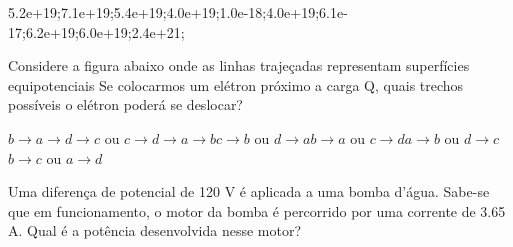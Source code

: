 \documentclass[12pt, addpoints]{exam}
\begin{document}
\begin{questions}
\begin{multicols*}{2}
\begin{oneparchoices}
\choice 5.2e+19;\choice 7.1e+19;\choice 5.4e+19;\choice 4.0e+19;\choice 1.0e-18;\choice 4.0e+19;\choice 6.1e-17;\choice 6.2e+19;\choice 6.0e+19;\choice 2.4e+21;\end{oneparchoices}
\question[20] Considere a figura abaixo onde as linhas trajeçadas representam superfícies equipotenciais Se colocarmos um elétron próximo a carga Q, quais trechos possíveis o elétron poderá se deslocar?
        
        \begin{center}
            \begin{minipage}[c]{0.5\linewidth}
            \end{minipage}
        \end{center}
        
        

\begin{choices}
\choice $b\rightarrow a\rightarrow d\rightarrow c$ ou $c\rightarrow d\rightarrow a\rightarrow b$\choice $c\rightarrow b$ ou $d\rightarrow a$\choice $b\rightarrow a$ ou $c\rightarrow d$\choice $a\rightarrow b$ ou $d\rightarrow c$\choice $b\rightarrow c$ ou $a\rightarrow d$\end{choices}
\question[20] Uma diferença de potencial de 120 V é aplicada a uma bomba d’água. Sabe-se que em funcionamento, o motor da bomba é percorrido por uma corrente de    3.65 A. Qual é a potência desenvolvida nesse motor?


\end{multicols*}
\end{questions}
\end{document}

